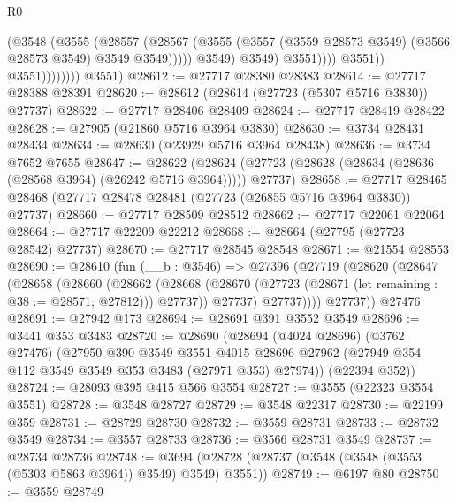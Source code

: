 \begin{lexlean}{R0}
\begin{coremodule}
                                    (@3548
                                      (@3555
                                        (@28557
                                          (@28567
                                            (@3555
                                              (@3557
                                                (@3559 @28573 @3549)
                                                (@3566 @28573 @3549)
                                                @3549
                                                @3549)))))
                                      @3549)
                                    @3549)
                                  @3551))))
                          @3551))
                      @3551))))))))
      @3551)
@28612 := @27717 @28380 @28383
@28614 := @27717 @28388 @28391
@28620 := @28612 (@28614 (@27723 (@5307 @5716 @3830)) @27737)
@28622 := @27717 @28406 @28409
@28624 := @27717 @28419 @28422
@28628 := @27905 (@21860 @5716 @3964 @3830)
@28630 := @3734 @28431 @28434
@28634 := @28630 (@23929 @5716 @3964 @28438)
@28636 := @3734 @7652 @7655
@28647 := @28622
    (@28624 (@27723 (@28628 (@28634 (@28636 (@28568 @3964) (@26242 @5716 @3964))))) @27737)
@28658 := @27717 @28465 @28468 (@27717 @28478 @28481 (@27723 (@26855 @5716 @3964 @3830)) @27737)
@28660 := @27717 @28509 @28512
@28662 := @27717 @22061 @22064
@28664 := @27717 @22209 @22212
@28668 := @28664 (@27795 (@27723 @28542) @27737)
@28670 := @27717 @28545 @28548
@28671 := @21554 @28553
@28690 := @28610
    (fun (__b : @3546) =>
    @27396
      (@27719
        (@28620
          (@28647
            (@28658
              (@28660
                (@28662
                  (@28668 (@28670 (@27723 (@28671 (let remaining : @38 := @28571; @27812))) @27737))
                  @27737)
                @27737))))
        @27737))
    @27476
@28691 := @27942 @173
@28694 := @28691 @391 @3552 @3549
@28696 := @3441 @353 @3483
@28720 := @28690
    (@28694
      (@4024 @28696)
      (@3762 @27476)
      (@27950
        @390
        @3549
        @3551
        @4015
        @28696
        @27962
        (@27949 @354 @112 @3549 @3549 @353 @3483 (@27971 @353) @27974))
      (@22394 @352))
@28724 := @28093 @395 @415 @566 @3554
@28727 := @3555 (@22323 @3554 @3551)
@28728 := @3548 @28727
@28729 := @3548 @22317
@28730 := @22199 @359
@28731 := @28729 @28730
@28732 := @3559 @28731
@28733 := @28732 @3549
@28734 := @3557 @28733
@28736 := @3566 @28731 @3549
@28737 := @28734 @28736
@28748 := @3694 (@28728 (@28737 (@3548 (@3548 (@3553 (@5303 @5863 @3964)) @3549) @3549) @3551))
@28749 := @6197 @80
@28750 := @3559 @28749

\end{coremodule}
\end{lexlean}
